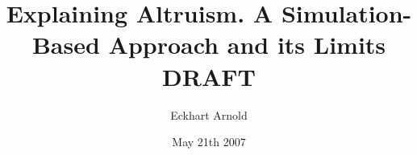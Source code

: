 \documentclass[11pt,a4paper,english]{book}
\begin{document}

\title{Explaining Altruism. A Simulation-Based Approach and its
Limits\\DRAFT}

\author{Eckhart Arnold}
\date{May 21th 2007}

\maketitle


\tableofcontents


\setcounter{page}{25}


\newpage



\end{document}
